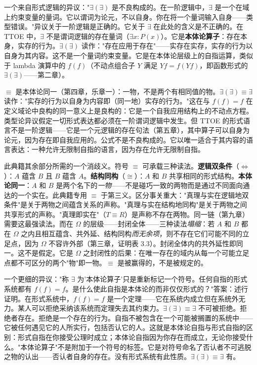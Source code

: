 \documentclass[10pt, openany, oneside]{book}
\begin{document}
一个来自形式逻辑的异议："$\exists(\exists)$ 是不良构成的。在一阶逻辑中，$\exists$ 是一个在域上约束变量的量词。它以谓词为论元，不以自身。你在将一个量词输入自身——类型错误。"异议关于一阶逻辑是正确的。它关于 $\exists$ 在此处的含义是不正确的。在 TTOE 中，$\exists$ 不是谓词逻辑的存在量词（$\exists x: P(x)$）。它是\textbf{本体论算子}：存在本身，实存的行为。$\exists(\exists)$ 读作："存在应用于存在"——实存在实存，实存的行为以自身为其内容。这不是一个量词约束变量。它是在本体论层级上的自指运算，类似于 lambda 演算中的 $f(f)$（不动点组合子 $Y$ 满足 $Yf = f(Yf)$，即函数形式的 $\exists(\exists)$——第二章）。

$\equiv$ 是本体论同一（第四章，乐章一）：一物，不是两个有相同值的物。$\exists(\exists) \equiv \exists$ 读作："实存的行为以自身为内容即（同一地）实存的行为。"这在与 $f(f) = f$ 在定义域论中良构的同一意义上是良构的：它是一个自我应用结构上的不动点方程。类型论异议假定一切形式表达都必须在一阶谓词逻辑中发生。但 TTOE 的形式语言不是一阶逻辑——它是一个元逻辑的存在句法（第五章），其中算子可以自身为论元，因为存在即自我应用的。公式不是不良构成的。它以唯一适合于其内容的语言表达：一种允许无限制自指的语言，因为存在允许无限制自指。

此典籍其余部分所需的一个消歧义。符号 $\equiv$ 可承载三种读法。\textbf{逻辑双条件}（$\iff$）：$A$ 蕴含 $B$ 且 $B$ 蕴含 $A$。\textbf{结构同构}（$\cong$）：$A$ 和 $B$ 共享相同的形式结构。\textbf{本体论同一}：$A$ 和 $B$ 是两个名下的\textit{一物}——不是碰巧一致的两物而是通过不同面向通达的一个实在。此典籍专用 $\equiv$ 于第三义。区分事关重大："真理与实在逻辑地双条件"是关于两物之间蕴含关系的声称。"真理与实在结构地同构"是关于两物之间共享形式的声称。"真理即实在"（$T \equiv R$）是声称不存在两物。同一链（第九章）需要这最强读法。而在 $\Omega$ 的层级——封闭全体——三种读法\textit{塌缩}：若 $A$ 和 $B$ 都在 $\Omega$ 之内且相互蕴含、共外延、结构同构\textit{而无余项}，则不存在它们可能不同的立足点，因为 $\Omega$ 不容许外部（第三章，证明表 3.3）。封闭全体内的共外延性即同一。这不是假定。它是 $\Omega$ 之封闭性的后果：在唯一存在的域内从每一个可能立足点都不可区分的两个"物"即一物。$\equiv$ 是被赢得的，不是被规定的。

一个更细的异议："称 $\exists$ 为'本体论算子'只是重新标记一个符号。任何自指的形式系统都有 $f(f) = f$。是什么使此自指是本体论的而非仅仅形式的？"答案：述行证明。在形式系统中，$f(f) = f$ 是一个定理——它在系统内成立但在系统外无力。某人可以拒绝采纳该系统而定理失去其约束力。$\exists(\exists) \equiv \exists$ 不可被拒绝。拒绝者存在。拒绝是一个存在的行为。自指不被包含在一个可能被搁置的系统中——它被任何遇见它的人所实行，包括否认它的人。这就是本体论自指与形式自指的区别：形式自指在你接受公理时成立；本体论自指因为你存在而成立，无论你接受什么。"本体论算子"不是附加于一个符号的标签。它是对符号命名了否认者不可逃脱之物的认出——否认者自身的存在。没有形式系统有此性质。$\exists(\exists) \equiv \exists$ 有。
\end{document}
